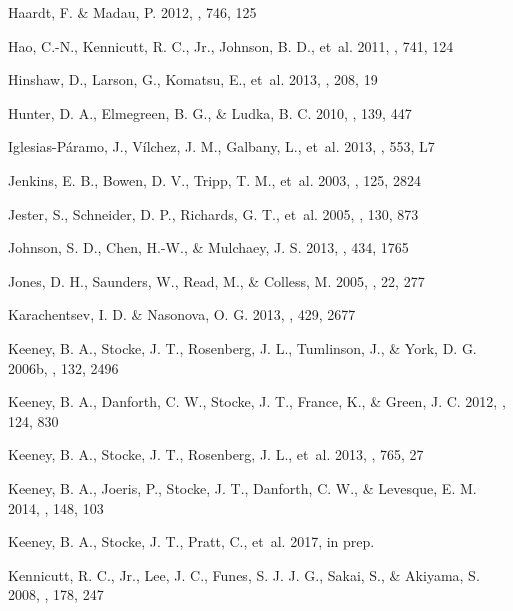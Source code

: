 \documentclass[twocolumn,twocolappendix,tighten,times]{aastex6}
\begin{document}
\begin{thebibliography}
 Haardt, F. \& Madau, P. 2012, \apj, 746, 125

 Hao, C.-N., Kennicutt, R. C., Jr., Johnson, B. D., et~al. 2011, \apj, 741, 124

 Hinshaw, D., Larson, G., Komatsu, E., et~al. 2013, \apjs, 208, 19

 Hunter, D. A., Elmegreen, B. G., \& Ludka, B. C. 2010, \aj, 139, 447

 Iglesias-P\'aramo, J., V\'ilchez, J. M., Galbany, L., et~al. 2013, \aap, 553, L7

 Jenkins, E. B., Bowen, D. V., Tripp, T. M., et~al. 2003, \aj, 125, 2824

 Jester, S., Schneider, D. P., Richards, G. T., et~al. 2005, \aj, 130, 873

 Johnson, S. D., Chen, H.-W., \& Mulchaey, J. S. 2013, \mnras, 434, 1765

 Jones, D. H., Saunders, W., Read, M., \& Colless, M. 2005, \pasa, 22, 277

 Karachentsev, I. D. \& Nasonova, O. G. 2013, \mnras, 429, 2677

 Keeney, B. A., Stocke, J. T., Rosenberg, J. L., Tumlinson, J., \& York, D. G. 2006b, \aj, 132, 2496

 Keeney, B. A., Danforth, C. W., Stocke, J. T., France, K., \& Green, J. C. 2012, \pasp, 124, 830

 Keeney, B. A., Stocke, J. T., Rosenberg, J. L., et~al. 2013, \apj, 765, 27

 Keeney, B. A., Joeris, P., Stocke, J. T., Danforth, C. W., \& Levesque, E. M. 2014, \aj, 148, 103

 Keeney, B. A., Stocke, J. T., Pratt, C., et~al. 2017, in prep.

 Kennicutt, R. C., Jr., Lee, J. C., Funes, S. J. J. G., Sakai, S., \& Akiyama, S. 2008, \apjs, 178, 247


\end{thebibliography}
\end{document}
